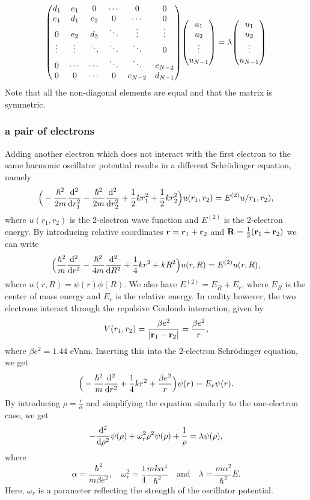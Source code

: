 \documentclass[notitlepage, reprint, nofootinbib]{revtex4-1}
\begin{document}
\begin{equation}\mqty (d_1&e_1&0&\cdots&0&0\\e_1&d_1&e_2&0&\cdots&0\\0&e_2&d_3&\ddots&\vdots&\vdots\\ \vdots&\vdots&\ddots&\ddots&\ddots&0\\0&\cdots&\cdots&\ddots&\ddots&e_{N-2}\\0&0&\cdots&0&e_{N-2}&d_{N-1})\mqty(u_1\\u_2\\ \vdots\\u_{N-1})=\lambda\mqty(u_1\\u_2\\ \vdots\\u_{N-1})\end{equation}
Note that all the non-diagonal elements are equal and that the matrix is symmetric.
\subsubsection{a pair of electrons}
Adding another electron which does not interact with the first electron to the same harmonic oscillator potential results in a different Schrödinger equation, namely 
$$\Big(-\frac{\hbar^2}{2m}\dv[2]{r_1}-\frac{\hbar^2}{2m}\dv[2]{r_2}+\frac{1}{2}kr_1^2+\frac{1}{2}kr_2^2\Big)u(r_1,r_2)=E^{(2)}u/r_1,r_2),$$
where $u(r_1,r_2)$ is the 2-electron wave function and $E^{(2)}$ is the 2-electron energy. By introducing relative coordinates $\vb{r}=\vb{r}_1+\vb{r}_2$ and $\vb{R}=\frac{1}{2}(\vb{r}_1+\vb{r}_2)$ we can write 
$$\Big(\frac{\hbar^2}{m}\dv[2]{r}-\frac{\hbar^2}{4m}\dv[2]{R}+\frac{1}{4}kr^2+kR^2\Big)u(r,R)=E^{(2)}u(r,R),$$
where $u(r,R)=\psi(r)\phi(R)$. We also have $E^{(2)}=E_R+E_r$, where $E_R$ is the center of mass energy and $E_r$ is the relative energy. In reality however, the two electrons interact through the repulsive Coulomb interaction, given by 
$$V(r_1,r_2)=\frac{\beta e^2}{|\vb{r}_1-\vb{r}_2|}=\frac{\beta e^2}{r},$$
where $\beta e^2=1.44$ eVnm. Inserting this into the 2-electron Schrödinger equation, we get 
$$\Big(-\frac{\hbar^2}{m}\dv[2]{r}+\frac{1}{4}kr^2+\frac{\beta e^2}{r}\Big)\psi(r)=E_r\psi(r).$$
By introducing $\rho=\frac{r}{\alpha}$ and simplifying the equation similarly to the one-electron case, we get 
\begin{equation}-\dv[2]{\rho}\psi(\rho)+\omega_r^2\rho^2\psi(\rho)+\frac{1}{\rho}=\lambda\psi(\rho),\end{equation}
where 
\begin{equation}\label{lol}\alpha=\frac{\hbar^2}{m\beta e^2},\quad\omega_r^2=\frac{1}{4}\frac{mk\alpha^4}{\hbar^2}\quad \text{and}\quad \lambda=\frac{m\alpha^2}{\hbar^2}E.\end{equation}
Here, $\omega_r$ is a parameter reflecting the strength of the oscillator potential. 
\newpage
\end{document}
